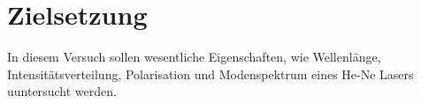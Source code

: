 \section{Zielsetzung}
In diesem Versuch sollen wesentliche Eigenschaften, wie Wellenlänge, Intensitätsverteilung, Polarisation und Modenspektrum eines
He-Ne Lasers uuntersucht werden.
\label{sec:Zielsetzung}
